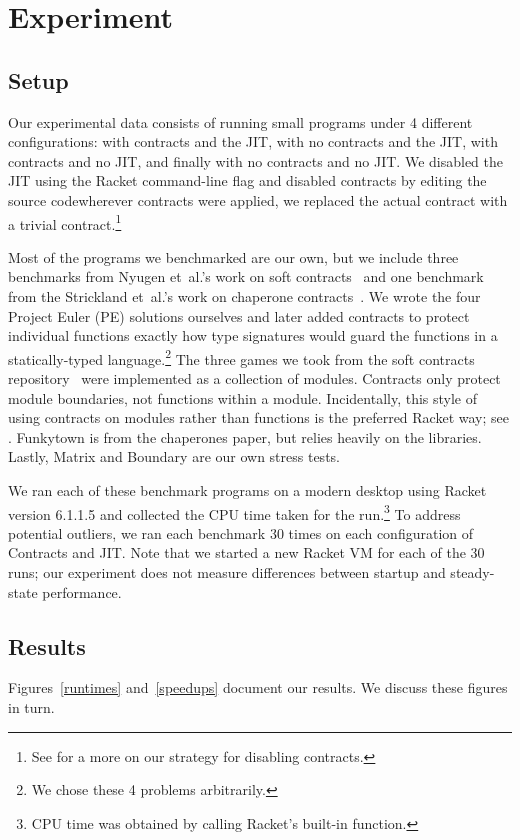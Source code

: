 \section{Experiment}
\label{experiment}
\subsection{Setup}
Our experimental data consists of running small programs under 4 different configurations: with contracts and the JIT, with no contracts and the JIT, with contracts and no JIT, and finally with no contracts and no JIT.
We disabled the JIT using the Racket command-line flag  and disabled contracts by editing the  source code\textemdash wherever contracts were applied, we replaced the actual contract with a trivial  contract.\footnote{See  for a more on our strategy for disabling contracts.}

Most of the programs we benchmarked are our own, but we include three benchmarks from Nyugen et~al.'s work on soft contracts~\cite{soft-contracts} and one benchmark from the Strickland et~al.'s work on chaperone contracts~\cite{chaps}.
We wrote the four Project Euler (PE) solutions ourselves and later added contracts to protect individual functions exactly how type signatures would guard the functions in a statically-typed language.\footnote{We chose these 4 problems arbitrarily.}
The three games we took from the soft contracts repository~\cite{soft-contracts-repo} were implemented as a collection of modules.
Contracts only protect module boundaries, not functions within a module.
Incidentally, this style of using contracts on modules rather than functions is the preferred Racket way; see .
Funkytown is from the chaperones paper, but relies heavily on the  libraries.
Lastly, Matrix and Boundary are our own stress tests.

We ran each of these benchmark programs on a modern desktop using Racket version 6.1.1.5 and collected the CPU time taken for the run.\footnote{CPU time was obtained by calling Racket's built-in  function.}
To address potential outliers, we ran each benchmark 30 times on each configuration of Contracts and JIT.
Note that we started a new Racket VM for each of the 30 runs; our experiment does not measure differences between startup and steady-state performance.



\subsection{Results}
Figures~\ref{runtimes} and~\ref{speedups} document our results.
We discuss these figures in turn.


